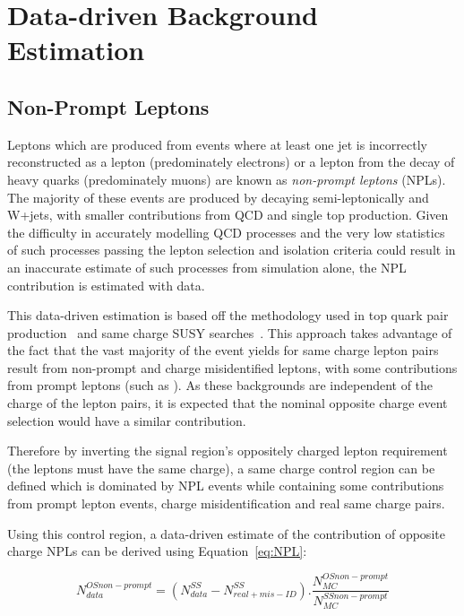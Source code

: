 \section{Data-driven Background Estimation}\label{sec:dataDrivenBackground}

\subsection{Non-Prompt Leptons}\label{sec:NPLs}
Leptons which are produced from events where at least one jet is incorrectly reconstructed as a lepton (predominately electrons) or a lepton from the decay of heavy quarks (predominately muons) are known as \emph{non-prompt leptons} (NPLs).
The majority of these events are produced by \ttbar decaying semi-leptonically and W+jets, with smaller contributions from QCD and single top production.
Given the difficulty in accurately modelling QCD processes and the very low statistics of such processes passing the lepton selection and isolation criteria could result in an inaccurate estimate of such processes from simulation alone, the NPL contribution is estimated with data.

This data-driven estimation is based off the methodology used in top quark pair production~\cite{CMS:2016syx} and same charge SUSY searches~\cite{CMS:2015vqc}.
This approach takes advantage of the fact that the vast majority of the event yields for same charge lepton pairs result from non-prompt and charge misidentified leptons, with some contributions from prompt leptons (such as \ttV).
As these backgrounds are independent of the charge of the lepton pairs, it is expected that the nominal opposite charge event selection would have a similar contribution.

Therefore by inverting the signal region's oppositely charged lepton requirement (\ie the leptons must have the same charge), a same charge control region can be defined which is dominated by NPL events while containing some contributions from prompt lepton events, charge misidentification and real same charge pairs.

Using this control region, a data-driven estimate of the contribution of opposite charge NPLs can be derived using Equation~\ref{eq:NPL}:

\begin{equation}\label{eq:NPL}
 N_{data}^{OS non-prompt} = (N_{data}^{SS} - N^{SS}_{real + mis-ID}).\frac{N_{MC}^{OS non-prompt}}{N_{MC}^{SS non-prompt}}
\end{equation}

